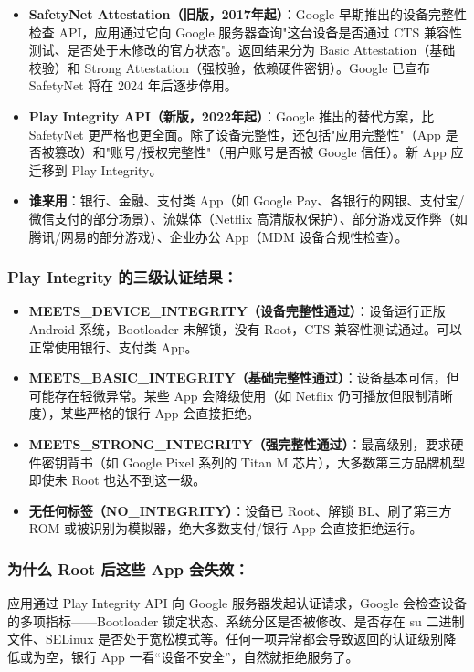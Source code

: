 \begin{itemize}
  \item \textbf{SafetyNet Attestation（旧版，2017年起）}：Google 早期推出的设备完整性检查 API，应用通过它向 Google 服务器查询"这台设备是否通过 CTS 兼容性测试、是否处于未修改的官方状态"。返回结果分为 Basic Attestation（基础校验）和 Strong Attestation（强校验，依赖硬件密钥）。Google 已宣布 SafetyNet 将在 2024 年后逐步停用。
  \item \textbf{Play Integrity API（新版，2022年起）}：Google 推出的替代方案，比 SafetyNet 更严格也更全面。除了设备完整性，还包括"应用完整性"（App 是否被篡改）和"账号/授权完整性"（用户账号是否被 Google 信任）。新 App 应迁移到 Play Integrity。
  \item \textbf{谁来用}：银行、金融、支付类 App（如 Google Pay、各银行的网银、支付宝/微信支付的部分场景）、流媒体（Netflix 高清版权保护）、部分游戏反作弊（如腾讯/网易的部分游戏）、企业办公 App（MDM 设备合规性检查）。
\end{itemize}

\subsubsection*{Play Integrity 的三级认证结果：}

\begin{itemize}
  \item \textbf{MEETS\_DEVICE\_INTEGRITY（设备完整性通过）}：设备运行正版 Android 系统，Bootloader 未解锁，没有 Root，CTS 兼容性测试通过。可以正常使用银行、支付类 App。
  \item \textbf{MEETS\_BASIC\_INTEGRITY（基础完整性通过）}：设备基本可信，但可能存在轻微异常。某些 App 会降级使用（如 Netflix 仍可播放但限制清晰度），某些严格的银行 App 会直接拒绝。
  \item \textbf{MEETS\_STRONG\_INTEGRITY（强完整性通过）}：最高级别，要求硬件密钥背书（如 Google Pixel 系列的 Titan M 芯片），大多数第三方品牌机型即使未 Root 也达不到这一级。
  \item \textbf{无任何标签（NO\_INTEGRITY）}：设备已 Root、解锁 BL、刷了第三方 ROM 或被识别为模拟器，绝大多数支付/银行 App 会直接拒绝运行。
\end{itemize}

\subsubsection*{为什么 Root 后这些 App 会失效：}

应用通过 Play Integrity API 向 Google 服务器发起认证请求，Google 会检查设备的多项指标——Bootloader 锁定状态、系统分区是否被修改、是否存在 su 二进制文件、SELinux 是否处于宽松模式等。任何一项异常都会导致返回的认证级别降低或为空，银行 App 一看“设备不安全”，自然就拒绝服务了。

